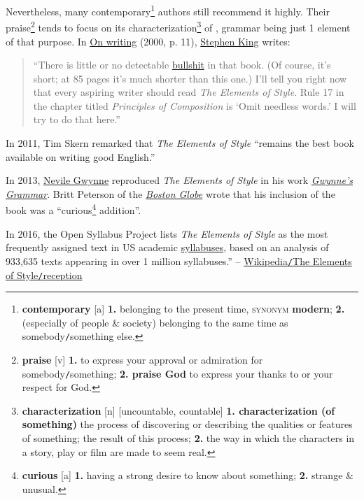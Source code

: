 \documentclass{article}
\begin{document}
Nevertheless, many contemporary\footnote{{\bf contemporary} [a] {\bf 1.} belonging to the present time, \textsc{synonym} {\bf modern}; {\bf 2.} (especially of people \& society) belonging to the same time as somebody{\tt/}something else.} authors still recommend it highly. Their praise\footnote{{\bf praise} [v] {\bf 1.} to express your approval or admiration for somebody{\tt/}something; {\bf 2. praise God} to express your thanks to or your respect for God.} tends to focus on its characterization\footnote{{\bf characterization} [n] [uncountable, countable] {\bf 1. characterization (of something)} the process of discovering or describing the qualities or features of something; the result of this process; {\bf 2.} the way in which the characters in a story, play or film are made to seem real.} of , grammar being just 1 element of that purpose. In \href{https://en.wikipedia.org/wiki/On_Writing:_A_Memoir_of_the_Craft}{On writing} (2000, p. 11), \href{https://en.wikipedia.org/wiki/Stephen_King}{Stephen King} writes:
\begin{quotation}
	``There is little or no detectable \href{https://en.wikipedia.org/wiki/Bullshit}{bullshit} in that book. (Of course, it's short; at 85 pages it's much shorter than this one.) I'll tell you right now that every aspiring writer should read {\it The Elements of Style}. Rule 17 in the chapter titled {\it Principles of Composition} is `Omit needless words.' I will try to do that here.''
\end{quotation}
In 2011, Tim Skern remarked that {\it The Elements of Style} ``remains the best book available on writing good English.''

In 2013, \href{https://en.wikipedia.org/wiki/Nevile_Gwynne}{Nevile Gwynne} reproduced {\it The Elements of Style} in his work \href{https://en.wikipedia.org/wiki/Gwynne%27s_Grammar}{{\it Gwynne's Grammar}}. Britt Peterson of the \href{https://en.wikipedia.org/wiki/Boston_Globe}{{\it Boston Globe}} wrote that his inclusion of the book was a ``curious\footnote{{\bf curious} [a] {\bf 1.} having a strong desire to know about something; {\bf 2.} strange \& unusual.} addition''.

In 2016, the Open Syllabus Project lists {\it The Elements of Style} as the most frequently assigned text in US academic \href{https://en.wikipedia.org/wiki/Syllabus}{syllabuses}, based on an analysis of 933,635 texts appearing in over 1 million syllabuses.'' -- \href{https://en.wikipedia.org/wiki/The_Elements_of_Style#Reception}{Wikipedia{\tt/}The Elements of Style{\tt/}reception}
\end{document}
